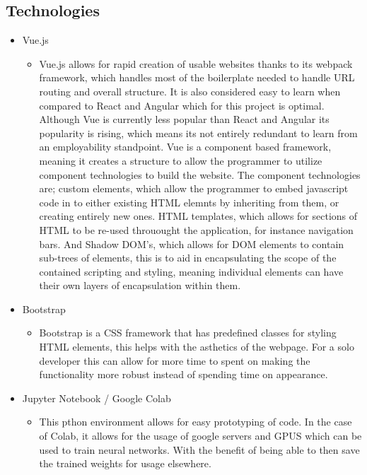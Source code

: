 \subsection{Technologies}
  \begin{itemize}
    \item Vue.js
    \begin{itemize}
      \item Vue.js allows for rapid creation of usable websites thanks to its webpack framework, which handles most of the boilerplate needed to handle URL routing and overall structure. It is also considered easy to learn when compared to React and Angular \cite{StudiengangBachelor} which for this project is optimal. Although Vue is currently less popular than React and Angular its popularity is rising, which means its not entirely redundant to learn from an employability standpoint. Vue is a component based framework, meaning it creates a structure to allow the programmer to utilize component technologies to build the website. The component technologies are; custom elements, which allow the programmer to embed javascript code in to either existing HTML elemnts by inheriting from them, or creating entirely new ones. HTML templates, which allows for sections of HTML to be re-used throuought the application, for instance navigation bars. And Shadow DOM's, which allows for DOM elements to contain sub-trees of elements, this is to aid in encapsulating the scope of the contained scripting and styling, meaning individual elements can have their own layers of encapsulation within them.
    \end{itemize}
    \item Bootstrap
        \begin{itemize}
          \item Bootstrap is a CSS framework that has predefined classes for styling HTML elements, this helps with the asthetics of the webpage. For a solo developer this can allow for more time to spent on making the functionality more robust instead of spending time on appearance.
        \end{itemize}
    \item Jupyter Notebook / Google Colab
      \begin{itemize}
        \item This pthon environment allows for easy prototyping of code. In the case of Colab, it allows for the usage of google servers and GPUS which can be used to train neural networks. With the benefit of being able to then save the trained weights for usage elsewhere.

\end{itemize}
\end{itemize}
